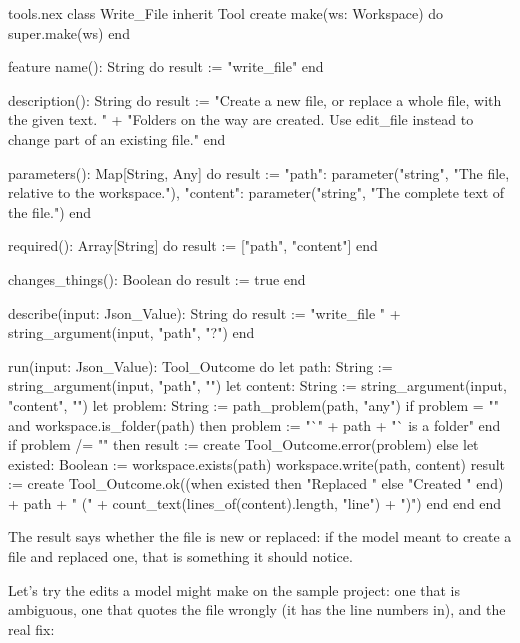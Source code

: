 \begin{append}{tools.nex}
class Write_File inherit Tool
create
  make(ws: Workspace) do
    super.make(ws)
  end

feature
  name(): String do
    result := "write_file"
  end

  description(): String do
    result := "Create a new file, or replace a whole file, with the given text. "
      + "Folders on the way are created. Use edit_file instead to change part of an existing file."
  end

  parameters(): Map[String, Any] do
    result := {"path": parameter("string", "The file, relative to the workspace."),
      "content": parameter("string", "The complete text of the file.")}
  end

  required(): Array[String] do
    result := ["path", "content"]
  end

  changes_things(): Boolean do
    result := true
  end

  describe(input: Json_Value): String do
    result := "write_file " + string_argument(input, "path", "?")
  end

  run(input: Json_Value): Tool_Outcome do
    let path: String := string_argument(input, "path", "")
    let content: String := string_argument(input, "content", "")
    let problem: String := path_problem(path, "any")
    if problem = "" and workspace.is_folder(path) then
      problem := "`" + path + "` is a folder"
    end
    if problem /= "" then
      result := create Tool_Outcome.error(problem)
    else
      let existed: Boolean := workspace.exists(path)
      workspace.write(path, content)
      result := create Tool_Outcome.ok((when existed then "Replaced " else "Created " end)
        + path + " (" + count_text(lines_of(content).length, "line") + ")")
    end
  end
end
\end{append}

The result says whether the file is new or replaced: if the model meant to
create a file and replaced one, that is something it should notice.

Let's try the edits a model might make on the sample project: one that is
ambiguous, one that quotes the file wrongly (it has the line numbers in),
and the real fix:

